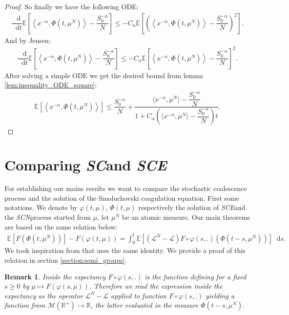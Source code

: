 \documentclass[11pt,a4paper]{article}
\newcommand{\RR}{\mathbb{R}}
\newcommand{\MC}{\mathcal{M}}
\newcommand{\LC}{\mathcal{L}}
\newcommand{\SC}{{\emph{SC}}}
\newcommand{\SCE}{\emph{SCE}}
\newcommand{\SCN}{\emph{SCN}}
\newcommand{\E}[1]{\mathbb{E}\left[#1\right]}
\newcommand{\dd}{\mathop{}\!\mathrm{d}}
\newtheorem{remark}[theorem]{Remark}
\begin{document}
\begin{proof}
    So finally we have the following ODE:
    \begin{align*}
        \dfrac{\dd}{\dd t} \E{\left\langle x^{-\alpha},\Phi(t,\mu^N)\right\rangle- \dfrac{S_0^{-\alpha}}{N}} \leq -C_\alpha\E{\left(\left\langle x^{-\alpha},\Phi(t,\mu^N)\right\rangle - \dfrac{S_0^{-\alpha}}{N}\right)^2}.
    \end{align*}
    And by Jensen:
   \begin{align*}
        \dfrac{\dd}{\dd t} \E{\left\langle x^{-\alpha},\Phi(t,\mu^N)\right\rangle- \dfrac{S_0^{-\alpha}}{N}} \leq -C_\alpha\E{\left\langle x^{-\alpha},\Phi(t,\mu^N)\right\rangle - \dfrac{S_0^{-\alpha}}{N}}^2.
    \end{align*}
    After solving a simple ODE we get the desired bound from lemma \ref{lem:inequality_ODE_square}:
    \begin{align*}
        \E{\left\langle x^{-\alpha},\Phi(t,\mu^N)\right\rangle} \leq \dfrac{S_0^{-\alpha}}{N} + \dfrac{\langle x^{-\alpha},\mu^N \rangle - \dfrac{S_0^{-\alpha}}{N}}{1 + C_\alpha \left(\langle x^{-\alpha},\mu^N \rangle - \dfrac{S_0^{-\alpha}}{N}\right)t}.
    \end{align*}
\end{proof}


\section{Comparing \SC and \SCE}
For establishing our mains results we want to compare the stochastic coalescence process and the solution of the Smoluchovski coagulation equation. First some notations. We denote by $\varphi(t,\mu)$, $\Phi(t,\mu)$ respectively the solution of \SCE and the \SCN process started from $\mu$, let $\mu^N$ be an atomic measure.
Our main theorems are based on the same relation below:
\begin{align}\label{eq:semi-group-relation}
\E{F(\Phi(t,\mu^N))} - F(\varphi\left(t,\mu\right)) = \int_0^t \E{\left(\LC^N - \LC\right)F\circ \varphi(s,.)\left(\Phi(t-s,\mu^N)\right)}\dd s.
\end{align}
We took inspiration from \cite{kolokoltsov2010central} that uses the same identity. We provide a proof of this relation in section \ref{section:semi_groups}.
\begin{remark}
    Inside the expectancy $F\circ \varphi(s,.)$ is the function defining for a fixed $s \geq 0$ by $\mu \mapsto F\left(\varphi(s,\mu)\right)$. Therefore we read the expression inside the expectancy as the operator $\LC^N - \LC$ applied to function $F\circ \varphi(s,.)$ yielding a function from $\MC(\RR^+) \to \RR $, the latter evaluated in the measure $\Phi(t-s,\mu^N)$.
\end{remark}
\end{document}
